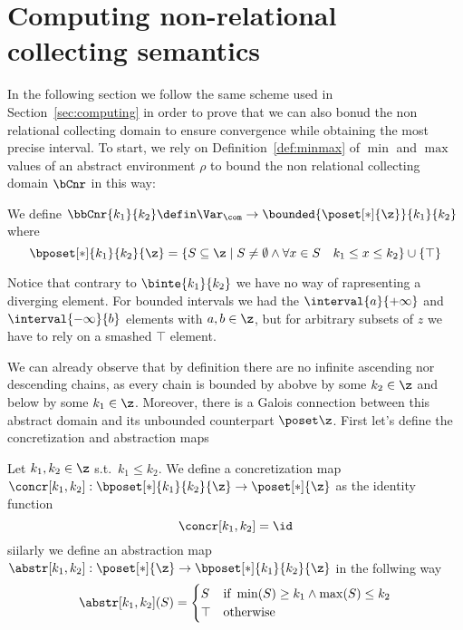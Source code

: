 \section{Computing non-relational collecting semantics}\label{sec:computingnonrel}

In the following section we follow the same scheme used in
Section~\ref{sec:computing} in order to prove that we can also bonud
the non relational collecting domain to ensure convergence while
obtaining the most precise interval.  To start, we rely on
Definition~\ref{def:minmax} of \(\min\) and \(\max\) values of an
abstract environment \(\rho\) to bound the non relational collecting
domain \(\bCnr\) in this way:

\begin{definition}
  We define
  \(\bbCnr{k_1}{k_2} \defin \Var_{\com} \to \bounded{\poset[*]{\z}}{k_1}{k_2}\) where
  \begin{equation*}
    \bposet[*]{k_1}{k_2}{\z} = \{S \subseteq \z \mid S \neq \emptyset \land \forall x \in S \quad k_1 \leq x \leq k_2\} \cup \{\top\}
  \end{equation*}
\end{definition}
Notice that contrary to \(\binte{k_1}{k_2}\) we have no way of
rapresenting a diverging element. For bounded intervals we had the
\(\interval{a}{+\infty}\) and \(\interval{-\infty}{b}\) elements with
\(a,b\in\z\), but for arbitrary subsets of \(z\) we have to rely on a
smashed \(\top\) element.

\medskip

\noindent
We can already observe that by definition there are no infinite
ascending nor descending chains, as every chain is bounded by abobve
by some \(k_2 \in \z\) and below by some \(k_1\in\z\). Moreover, there
is a Galois connection between this abstract domain and its unbounded
counterpart \(\poset\z\). First let's define the concretization and
abstraction maps

\begin{definition}\label{def:abstrnrb}
  Let \(k_1,k_2\in\z\) s.t.\ \(k_1 \leq k_2\). We define a
  concretization map
  \(\concr[k_1,k_2] : \bposet[*]{k_1}{k_2}{\z} \to \poset[*]{\z}\) as
  the identity function
  \begin{equation*}
    \concr[k_1,k_2] = \id
  \end{equation*}
  siilarly we define an abstraction map
  \(\abstr[k_1,k_2] : \poset[*]{\z} \to \bposet[*]{k_1}{k_2}{\z}\) in
  the follwing way
  \begin{equation*}
    \abstr[k_1,k_2](S) = \begin{cases}
      S & \text{if } \min(S) \geq k_1 \land \max(S) \leq k_2 \\
      \top & \text{otherwise}
    \end{cases}
  \end{equation*}
\end{definition}

